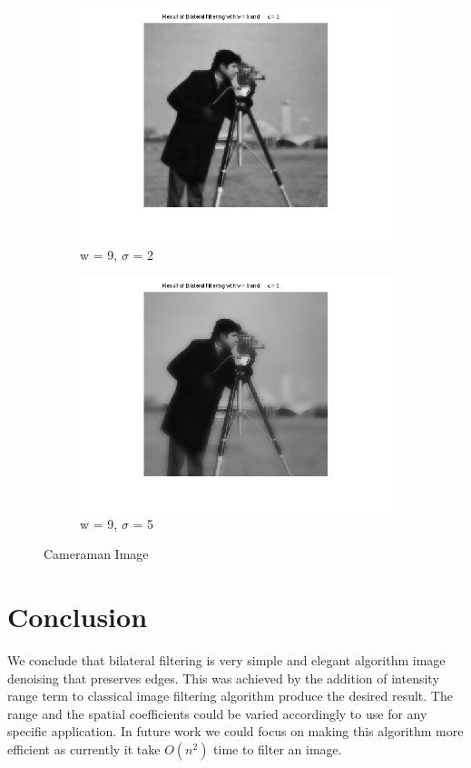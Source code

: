 \documentclass[12pt]{article}
\begin{document}
\begin{figure}[ht!]
        \begin{subfigure}[b]{0.45\textwidth}
                \includegraphics[width=\textwidth]{w9s2.png}
                \caption{w = 9, $\sigma$ = 2}
        \end{subfigure}%
        \begin{subfigure}[b]{0.45\textwidth}
                \includegraphics[width=\textwidth]{w9s5.png}
                \caption{w = 9, $\sigma$ = 5}
        \end{subfigure}
        \caption{Cameraman Image}
\end{figure}

\pagebreak


\section{Conclusion}
We conclude that bilateral filtering is very simple and elegant algorithm image denoising that preserves edges. This was achieved by the addition of intensity range term to classical image filtering algorithm produce the desired result. The range and the spatial coefficients could be varied accordingly to use for any specific application. In future work we could focus on making this algorithm more efficient as currently it take $O(n^{2})$ time to filter an image.
\end{document}
